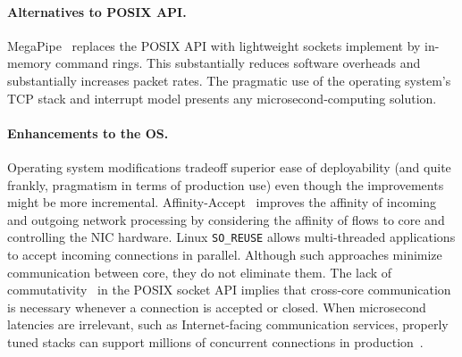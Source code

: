\paragraph{Alternatives to POSIX API.}

MegaPipe~\cite{han2012megapipe} replaces the POSIX API with
lightweight sockets implement by in-memory command rings.  This
substantially reduces software overheads and substantially increases
packet rates.  The pragmatic use of the operating system's TCP stack
and interrupt model presents any microsecond-computing solution.

\paragraph{Enhancements to the OS.}

Operating system modifications tradeoff superior ease of deployability
(and quite frankly, pragmatism in terms of production use) even though
the improvements might be more incremental.
Affinity-Accept~\cite{DBLP:conf/eurosys/PesterevSZM12} improves the
affinity of incoming and outgoing network processing by considering
the affinity of flows to core and controlling the NIC hardware.  Linux
\texttt{SO\_REUSE} allows multi-threaded applications to accept
incoming connections in parallel.  Although such approaches minimize
communication between core, they do not eliminate them.  The lack of
commutativity~\cite{DBLP:conf/sosp/ClementsKZMK13} in the POSIX socket
API implies that cross-core communication is necessary whenever a
connection is accepted or closed.  When microsecond latencies are
irrelevant, such as Internet-facing communication services, properly
tuned stacks can support millions of concurrent connections in
production~\cite{whatsapp-2mil}.  
